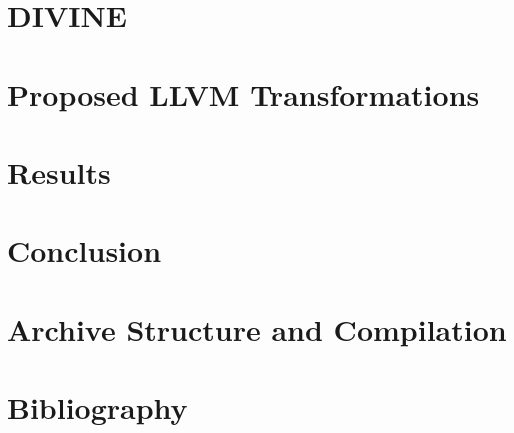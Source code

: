 \documentclass[11pt,twoside,a4paper]{book}
\newcommand{\divine}{\mbox{\textsf{DIVINE}}\xspace}
\newcommand{\llvm}{\textsf{LLVM}\xspace}
\begin{document}
\chapter{\divine} \label{chap:divine}


\chapter{Proposed \llvm Transformations} \label{chap:trans}


\chapter{Results} \label{chap:results}


\chapter{Conclusion} \label{chap:conclusion}


\appendix
\chapter{Archive Structure and Compilation} \label{chap:appendix}


\chapter*{Bibliography}
\markboth{}{} %
\printbibliography[heading=none]
\end{document}
